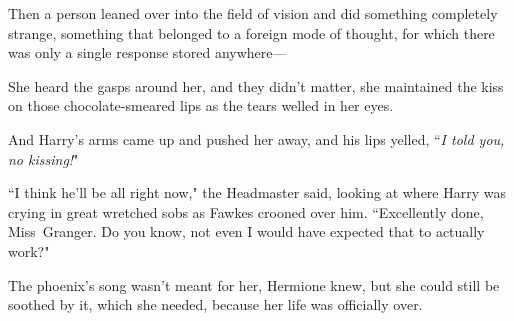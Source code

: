 Then a person leaned over into the field of vision and did something completely strange, something that belonged to a foreign mode of thought, for which there was only a single response stored anywhere---

\later

She heard the gasps around her, and they didn't matter, she maintained the kiss on those chocolate-smeared lips as the tears welled in her eyes.

And Harry's arms came up and pushed her away, and his lips yelled, ``\emph{I told you, no kissing!}"

\later

``I think he'll be all right now," the Headmaster said, looking at where Harry was crying in great wretched sobs as Fawkes crooned over him. ``Excellently done, Miss~Granger. Do you know, not even I would have expected that to actually work?"

The phoenix's song wasn't meant for her, Hermione knew, but she could still be soothed by it, which she needed, because her life was officially over.

